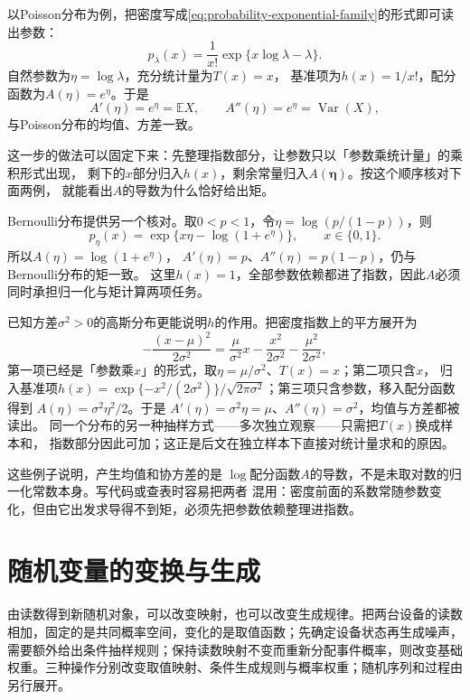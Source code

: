 以Poisson分布为例，把密度写成\eqref{eq:probability-exponential-family}的形式即可读出参数：
\[ p_\lambda(x)
  =\frac{1}{x!}\exp\{x\log\lambda-\lambda\}. \]
自然参数为\(\eta=\log\lambda\)，充分统计量为\(T(x)=x\)，
基准项为\(h(x)=1/x!\)，配分函数为\(A(\eta)=e^\eta\)。于是
\[ A'(\eta)=e^\eta=\mathbb{E}X,
  \qquad A''(\eta)=e^\eta=\operatorname{Var}(X), \]
与Poisson分布的均值、方差一致。

这一步的做法可以固定下来：先整理指数部分，让参数只以「参数乘统计量」的乘积形式出现，
剩下的\(x\)部分归入\(h(x)\)，剩余常量归入\(A(\bm\eta)\)。按这个顺序核对下面两例，
就能看出\(A\)的导数为什么恰好给出矩。

Bernoulli分布提供另一个核对。取\(0<p<1\)，令\(\eta=\log(p/(1-p))\)，则
\[
  p_\eta(x)=\exp\{x\eta-\log(1+e^\eta)\},
  \qquad x\in\{0,1\}.
\]
所以\(A(\eta)=\log(1+e^\eta)\)，
\(A'(\eta)=p\)、\(A''(\eta)=p(1-p)\)，仍与Bernoulli分布的矩一致。
这里\(h(x)=1\)，全部参数依赖都进了指数，因此\(A\)必须同时承担归一化与矩计算两项任务。

已知方差\(\sigma^2>0\)的高斯分布更能说明\(h\)的作用。把密度指数上的平方展开为
\[
  -\frac{(x-\mu)^2}{2\sigma^2}
  =\frac{\mu}{\sigma^2}x-\frac{x^2}{2\sigma^2}-\frac{\mu^2}{2\sigma^2},
\]
第一项已经是「参数乘\(x\)」的形式，取\(\eta=\mu/\sigma^2\)、\(T(x)=x\)；第二项只含\(x\)，
归入基准项\(h(x)=\exp\{-x^2/(2\sigma^2)\}/\sqrt{2\pi\sigma^2}\)；第三项只含参数，移入配分函数得到
\(A(\eta)=\sigma^2\eta^2/2\)。于是
\(A'(\eta)=\sigma^2\eta=\mu\)、\(A''(\eta)=\sigma^2\)，均值与方差都被读出。
同一个分布的另一种抽样方式——多次独立观察——只需把\(T(x)\)换成样本和，
指数部分因此可加；这正是后文在独立样本下直接对统计量求和的原因。

这些例子说明，产生均值和协方差的是
\(\log\)配分函数\(A\)的导数，不是未取对数的归一化常数本身。写代码或查表时容易把两者
混用：密度前面的系数常随参数变化，但由它出发求导得不到矩，必须先把参数依赖整理进指数。

\section{随机变量的变换与生成}
\label{sec:rv-transformations}
\label{sec:probability-random-vectors-transformations}
由读数得到新随机对象，可以改变映射，也可以改变生成规律。把两台设备的读数相加，固定的是共同概率空间，变化的是取值函数；先确定设备状态再生成噪声，需要额外给出条件抽样规则；保持读数映射不变而重新分配事件概率，则改变基础权重。三种操作分别改变取值映射、条件生成规则与概率权重；随机序列和过程由另行展开。

